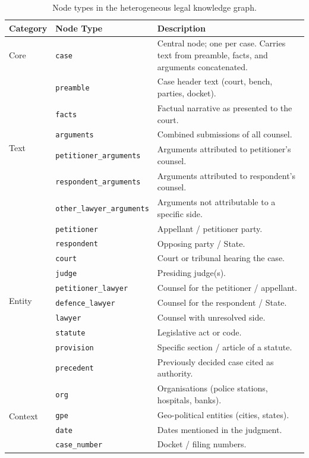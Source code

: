 \begin{table}[H]
\centering
\caption{Node types in the heterogeneous legal knowledge graph.}
\label{tab:node-types}
\begin{tabular}{@{}llp{7.5cm}@{}}
\toprule
\textbf{Category} & \textbf{Node Type} & \textbf{Description} \\
\midrule
\multirow{1}{*}{Core}
& \texttt{case} & Central node; one per case. Carries text from preamble, facts, and arguments concatenated. \\
\midrule
\multirow{6}{*}{Text}
& \texttt{preamble} & Case header text (court, bench, parties, docket). \\
& \texttt{facts} & Factual narrative as presented to the court. \\
& \texttt{arguments} & Combined submissions of all counsel. \\
& \texttt{petitioner\_arguments} & Arguments attributed to petitioner's counsel. \\
& \texttt{respondent\_arguments} & Arguments attributed to respondent's counsel. \\
& \texttt{other\_lawyer\_arguments} & Arguments not attributable to a specific side. \\
\midrule
\multirow{10}{*}{Entity}
& \texttt{petitioner} & Appellant / petitioner party. \\
& \texttt{respondent} & Opposing party / State. \\
& \texttt{court} & Court or tribunal hearing the case. \\
& \texttt{judge} & Presiding judge(s). \\
& \texttt{petitioner\_lawyer} & Counsel for the petitioner / appellant. \\
& \texttt{defence\_lawyer} & Counsel for the respondent / State. \\
& \texttt{lawyer} & Counsel with unresolved side. \\
& \texttt{statute} & Legislative act or code. \\
& \texttt{provision} & Specific section / article of a statute. \\
& \texttt{precedent} & Previously decided case cited as authority. \\
\midrule
\multirow{4}{*}{Context}
& \texttt{org} & Organisations (police stations, hospitals, banks). \\
& \texttt{gpe} & Geo-political entities (cities, states). \\
& \texttt{date} & Dates mentioned in the judgment. \\
& \texttt{case\_number} & Docket / filing numbers. \\
\bottomrule
\end{tabular}
\end{table}

